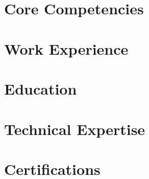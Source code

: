 \documentclass[10pt,letterpaper]{article}
\begin{document}
\begin{center}
    \textbf{\Huge \fullname} \\
    \vspace{2pt}
    \email \space {\large \divider{}} \phone \space {\large \divider{}} \location \\
    \vspace{1pt}
    \linkedin
\end{center}

\noindent\professionalsummary

\section{Core Competencies}
\noindent\corecompetencies

\section{Work Experience}



\section{Education}
\noindent\position{\education}{\degree} \daterange{\graduationdate}
\noindent\position{}{\schoollocation}

\section{Technical Expertise}
\noindent\technicalexpertise

\section{Certifications}
\noindent\certifications
\end{document}
